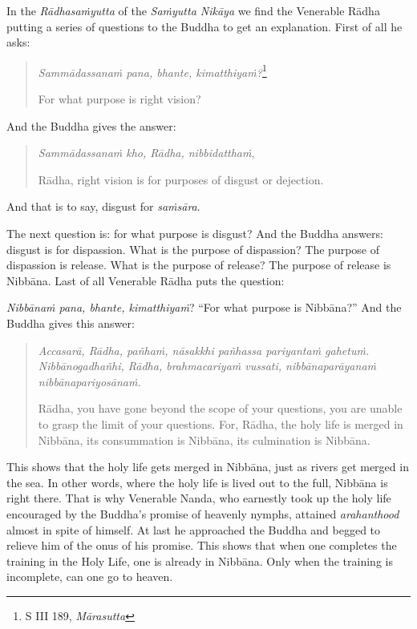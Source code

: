 In the \emph{Rādhasaṁyutta} of the \emph{Saṁyutta Nikāya} we find the Venerable Rādha putting a series of questions to the Buddha to get an explanation. First of all he asks:

\begin{quote}
\emph{Sammādassanaṁ pana, bhante, kimatthiyaṁ?}\footnote{S III 189, \emph{Mārasutta}}

For what purpose is right vision?
\end{quote}

And the Buddha gives the answer:

\begin{quote}
\emph{Sammādassanaṁ kho, Rādha, nibbidatthaṁ},

Rādha, right vision is for purposes of disgust or dejection.
\end{quote}

And that is to say, disgust for \emph{saṁsāra}.

The next question is: for what purpose is disgust? And the Buddha answers: disgust is for dispassion. What is the purpose of dispassion? The purpose of dispassion is release. What is the purpose of release? The purpose of release is Nibbāna. Last of all Venerable Rādha puts the question:

\emph{Nibbānaṁ pana, bhante, kimatthiyaṁ}? ``For what purpose is Nibbāna?'' And the Buddha gives this answer:

\begin{quote}
\emph{Accasarā, Rādha, pañhaṁ, nāsakkhi pañhassa pariyantaṁ gahetuṁ. Nibbānogadhañhi, Rādha, brahmacariyaṁ vussati, nibbānaparāyanaṁ nibbānapariyosānaṁ.}

Rādha, you have gone beyond the scope of your questions, you are unable to grasp the limit of your questions. For, Rādha, the holy life is merged in Nibbāna, its consummation is Nibbāna, its culmination is Nibbāna.
\end{quote}

This shows that the holy life gets merged in Nibbāna, just as rivers get merged in the sea. In other words, where the holy life is lived out to the full, Nibbāna is right there. That is why Venerable Nanda, who earnestly took up the holy life encouraged by the Buddha's promise of heavenly nymphs, attained \emph{arahanthood} almost in spite of himself. At last he approached the Buddha and begged to relieve him of the onus of his promise. This shows that when one completes the training in the Holy Life, one is already in Nibbāna. Only when the training is incomplete, can one go to heaven.

